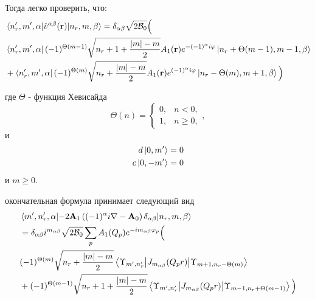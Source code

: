 \documentclass[a4paper,article,14pt]{extarticle}
\begin{document}
Тогда легко проверить, что:
\begin{equation}
\begin{aligned}
&\mel{n_r',m',\alpha} {\hat v^{\alpha \beta}(\mathbf{r}) }{n_r, m,\beta} =
 \delta_{\alpha \beta} \sqrt{ {2{\cal{B}}_0} } \Big( \\
&\bra{n_r',m',\alpha} (-1)^{\Theta(m-1)}  \sqrt{n_r + 1 + \frac{|m| - m}{2}  }  A_{1} (\mathbf{r}) e^{ -(-1)^{\alpha} i \varphi}   \ket{n_r+\Theta(m-1), m-1,\beta}  \\
&+ \bra{n_r',m',\alpha} (-1)^{\Theta(m)} \sqrt{  n_r + \frac{|m| - m}{2}  }  A_{1} (\mathbf{r}) e^{(-1)^\alpha i \varphi} \ket{n_r-\Theta(m), m +1 ,\beta}   \Big) \\
\end{aligned}
\end{equation}

\noindent где $\Theta$ - функция Хевисайда
$$
\Theta(n)=\begin{cases} 0, & n < 0, \\ 1, & n \ge 0, \end{cases},
$$
и
\begin{equation}
\begin{aligned}
d \ket{0, m'} &= 0 \\
c \ket{0, -m'} &= 0 \\
\end{aligned}
\end{equation}
\noindent и $m \ge 0$.



\noindent окончательная формула принимает следующий вид
\begin{equation}
\label{eq:final_v}
\begin{aligned}
&\mel{m', n'_r, \alpha} { - 2 \mathbf{A}_1 \left( (-1)^{\alpha} i \nabla - \mathbf{A}_0 \right) \delta_{\alpha \beta}} {n_r, m, \beta} \\
&= \delta_{\alpha \beta} i^{m_{\alpha \beta} }  \sqrt{ {2{\cal{B}}_0} } \sum\limits_{p}  A_{1} (Q_p) e^{- i m_{\alpha \beta}\varphi_p} \Big(  \\
&(-1)^{\Theta(m)} \sqrt{  n_r + \frac{|m| - m}{2}  }   \mel{\Upsilon_{m', n'_r}} {J_{m_{\alpha \beta}} (Q_p r)} {\Upsilon_{m +1, n_r-\Theta(m)}}  \\
&  + (-1)^{\Theta(m-1)} \sqrt{n_r + 1 + \frac{|m| - m}{2}  }   \mel{\Upsilon_{m', n'_r}} {J_{m_{\alpha \beta}} (Q_p r)} {\Upsilon_{m-1, n_r+\Theta(m-1)}} 
\Big)
\end{aligned}
\end{equation}
\end{document}
